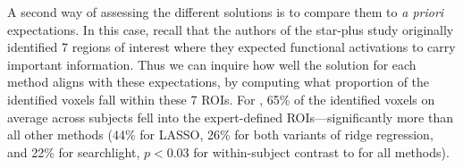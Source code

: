 A second way of assessing the different solutions is to compare them to \emph{a priori} expectations. In this case, recall that the authors of the star-plus study originally identified 7 regions of interest where they expected functional activations to carry important information. Thus we can inquire how well the solution for each method aligns with these expectations, by computing what proportion of the identified voxels fall within these 7 ROIs. For {\soslasso}, 65\% of the identified voxels on average across subjects fell into the expert-defined ROIs---significantly more than all other methods (44\% for LASSO, 26\% for both variants of ridge regression, and 22\% for searchlight, $p < 0.03$ for within-subject contrast to {\soslasso} for all methods).

